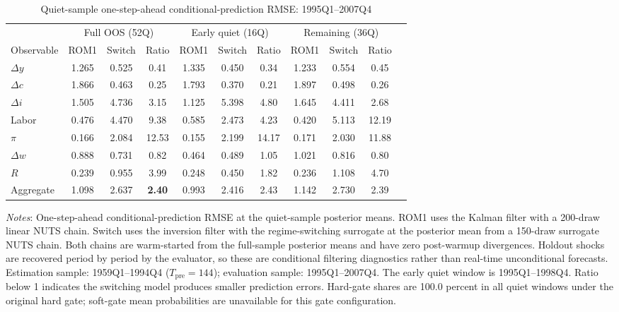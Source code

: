 \documentclass[12pt]{article}
\theoremstyle{plain}
\theoremstyle{definition}
\theoremstyle{remark}
\newcommand{\tablenotes}[1]{%
  \par\vspace{0.5em}%
  \noindent\begin{minipage}{\textwidth}%
  \raggedright\footnotesize #1%
  \end{minipage}\par%
}
\begin{document}
\begin{table}[htbp]
\centering
\caption{Quiet-sample one-step-ahead conditional-prediction RMSE: 1995Q1--2007Q4}
\label{tab:oos_forecast_quiet}
\small
\begin{tabular}{lcccccccccc}
\toprule
& \multicolumn{3}{c}{Full OOS (52Q)} & \multicolumn{3}{c}{Early quiet (16Q)} & \multicolumn{3}{c}{Remaining (36Q)} \\
\cmidrule(lr){2-4} \cmidrule(lr){5-7} \cmidrule(lr){8-10}
Observable & ROM1 & Switch & Ratio & ROM1 & Switch & Ratio & ROM1 & Switch & Ratio \\
\midrule
$\Delta y$   & 1.265 & 0.525 & 0.41 & 1.335 & 0.450 & 0.34 & 1.233 & 0.554 & 0.45 \\
$\Delta c$   & 1.866 & 0.463 & 0.25 & 1.793 & 0.370 & 0.21 & 1.897 & 0.498 & 0.26 \\
$\Delta i$   & 1.505 & 4.736 & 3.15 & 1.125 & 5.398 & 4.80 & 1.645 & 4.411 & 2.68 \\
Labor        & 0.476 & 4.470 & 9.38 & 0.585 & 2.473 & 4.23 & 0.420 & 5.113 & 12.19 \\
$\pi$        & 0.166 & 2.084 & 12.53 & 0.155 & 2.199 & 14.17 & 0.171 & 2.030 & 11.88 \\
$\Delta w$   & 0.888 & 0.731 & 0.82 & 0.464 & 0.489 & 1.05 & 1.021 & 0.816 & 0.80 \\
$R$          & 0.239 & 0.955 & 3.99 & 0.248 & 0.450 & 1.82 & 0.236 & 1.108 & 4.70 \\
\midrule
Aggregate    & 1.098 & 2.637 & \textbf{2.40} & 0.993 & 2.416 & 2.43 & 1.142 & 2.730 & 2.39 \\
\bottomrule
\end{tabular}
\smallskip
\tablenotes{\textit{Notes}: One-step-ahead conditional-prediction RMSE at the quiet-sample posterior means. ROM1 uses the Kalman filter with a 200-draw linear NUTS chain. Switch uses the inversion filter with the regime-switching surrogate at the posterior mean from a 150-draw surrogate NUTS chain. Both chains are warm-started from the full-sample posterior means and have zero post-warmup divergences. Holdout shocks are recovered period by period by the evaluator, so these are conditional filtering diagnostics rather than real-time unconditional forecasts. Estimation sample: 1959Q1--1994Q4 ($T_{\text{pre}} = 144$); evaluation sample: 1995Q1--2007Q4. The early quiet window is 1995Q1--1998Q4. Ratio below 1 indicates the switching model produces smaller prediction errors. Hard-gate shares are 100.0 percent in all quiet windows under the original hard gate; soft-gate mean probabilities are unavailable for this gate configuration.}
\end{table}
\end{document}
